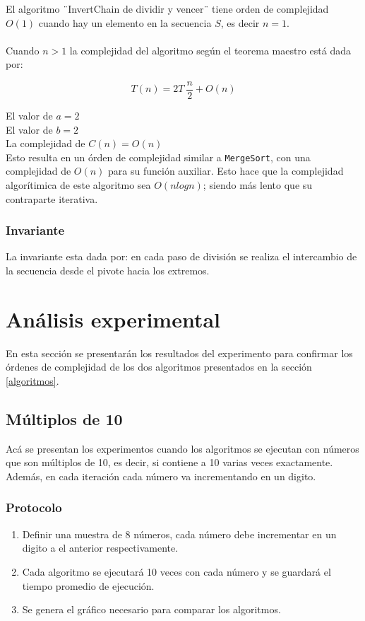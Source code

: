 \documentclass[letter]{article}
\begin{document}
El algoritmo ¨InvertChain de dividir y vencer¨ tiene orden de complejidad $O(1)$ cuando hay un elemento en la secuencia $S$, es decir $n=1$.\\
     \\
     Cuando $n>1$ la complejidad del algoritmo según el teorema maestro está dada por:
    
     \begin{equation}
T(n)= 2T\  \frac{n}{2} + O(n)
\end{equation}
    
El valor de $a = 2$\\
El valor de $b = 2$\\
La complejidad de $C(n) = O(n)$\\
    
Esto resulta en un órden de complejidad similar a \texttt{MergeSort}, con una complejidad de $O(n)$ para su función auxiliar. Esto hace que la complejidad algorítimica de este algoritmo sea $O(nlogn)$; siendo más lento que su contraparte iterativa.

\subsubsection{Invariante} \label{algoritmos:inocente:invariante}

La invariante esta dada por: en cada paso de división se realiza el intercambio de la secuencia desde el pivote hacia los extremos.

\section{Análisis experimental} \label{experimentos}

En esta sección se presentarán los resultados del experimento para confirmar los órdenes de complejidad de los dos algoritmos presentados en la sección \ref{algoritmos}.

\subsection{Múltiplos de 10} \label{experimentos:aleatorias}

Acá se presentan los experimentos cuando los algoritmos se ejecutan con números que son múltiplos de 10, es decir, si contiene a 10 varias veces exactamente. Además, en cada iteración cada número va incrementando en un digito.

\subsubsection{Protocolo}
\begin{enumerate}
    \item Definir una muestra de 8 números, cada número debe incrementar en un digito a el anterior respectivamente.
    \item Cada algoritmo se ejecutará 10 veces con cada número y se guardará el tiempo promedio de ejecución.
    \item Se genera el gráfico necesario para comparar los algoritmos.
\end{enumerate}
\end{document}
